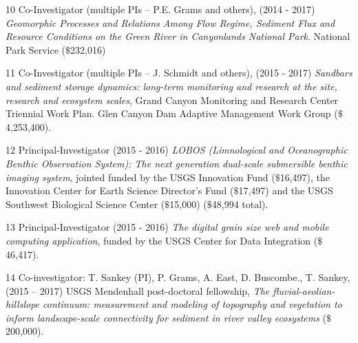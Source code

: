 \documentclass[margin,line]{resume}
\begin{document}
\begin{resume}
\begin{footnotesize}
\begin{list1}
	\item[10] Co-Investigator (multiple PIs – P.E. Grams and others), (2014 - 2017) {\sl Geomorphic Processes and Relations Among Flow Regime, Sediment Flux and Resource Conditions on the Green River in Canyonlands National Park}. National Park Service ($\$$232,016)\\

	\item[11] Co-Investigator (multiple PIs – J. Schmidt and others), (2015 - 2017) {\sl Sandbars and sediment storage dynamics: long-term monitoring and research at the site, research and ecosystem scales}, Grand Canyon Monitoring and Research Center Triennial Work Plan. Glen Canyon Dam Adaptive Management Work Group ($\$$4,253,400).\\

	\item[12] Principal-Investigator (2015 - 2016) {\sl LOBOS (Limnological and Oceanographic Benthic Observation System): The next generation dual-scale submersible benthic imaging system}, jointed funded by the USGS Innovation Fund ($\$$16,497), the Innovation Center for Earth Science Director's Fund ($\$$17,497) and the USGS Southwest Biological Science Center ($\$$15,000) ($\$$48,994 total).\\

	\item[13] Principal-Investigator (2015 - 2016) {\sl The digital grain size web and mobile computing application}, funded by the USGS Center for Data Integration ($\$$46,417).\\
	
	\item[14] Co-investigator: T. Sankey (PI), P. Grams, A. East, D. Buscombe., T. Sankey, (2015 – 2017) USGS Mendenhall post-doctoral fellowship, {\sl The fluvial-aeolian- hillslope continuum: measurement and modeling of topography and vegetation to inform landscape-scale connectivity for sediment in river valley ecosystems} ($\$$200,000).\\

	\end{list1}
        \end{footnotesize}


\end{resume}
\end{document}
